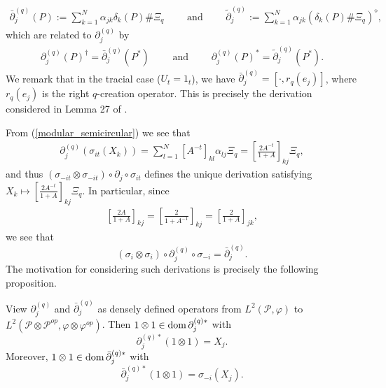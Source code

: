 	\begin{align*}
		\bar{\partial}_j^{(q)}(P):=\sum_{k=1}^N \alpha_{jk}\delta_k(P)\# \Xi_q\qquad\text{ and }\qquad \tilde{\partial}_j^{(q)} :=\sum_{k=1}^N \alpha_{jk} \left(\delta_k(P)\# \Xi_q\right)^\diamond,
	\end{align*}
which are related to $\partial_j^{(q)}$ by
	\begin{align*}
		\partial_j^{(q)}(P)^\dagger=\bar{\partial}_j^{(q)}(P^*)\qquad\text{ and }\qquad \partial_j^{(q)}(P)^* = \tilde{\partial}_j^{(q)}(P^*).
	\end{align*}
We remark that in the tracial case ($U_t=1_t$), we have $\bar{\partial}_{j}^{(q)}=[\cdot, r_q(e_j)]$, where $r_q(e_j)$ is the right $q$-creation operator. This is precisely the derivation considered in Lemma 27 of \cite{D}.\par
From (\ref{modular_semicircular}) we see that
	\begin{align*}
		\partial_j^{(q)}(\sigma_{it}(X_k))=\sum_{l=1}^N [A^{-t}]_{kl} \alpha_{lj} \Xi_q = \left[\frac{2A^{-t}}{1+A}\right]_{kj} \Xi_q,
	\end{align*}
and thus $(\sigma_{-it}\otimes\sigma_{-it})\circ\partial_j\circ\sigma_{it}$ defines the unique derivation satisfying $X_k\mapsto \left[\frac{2A^{-t}}{1+A}\right]_{kj}\Xi_q$. In particular, since
	\begin{align*}
		\left[\frac{2A}{1+A}\right]_{kj}=\left[\frac{2}{1+A^{-1}}\right]_{kj}=\left[\frac{2}{1+A}\right]_{jk},
	\end{align*}
we see that
	\begin{equation}\label{differentiating_sigma_with_q}
		(\sigma_i\otimes\sigma_i)\circ\partial_j^{(q)}\circ\sigma_{-i}=\bar{\partial}_j^{(q)}.
	\end{equation}
The motivation for considering such derivations is precisely the following proposition.

\begin{prop}\label{adjoint_of_q-derivations}
View $\partial_j^{(q)}$ and $\bar{\partial}_j^{(q)}$ as densely defined operators from $L^2(\mathscr{P},\varphi)$ to $L^2(\mathscr{P}\otimes \mathscr{P}^{op},\varphi\otimes\varphi^{op})$. Then $1\otimes 1\in \text{dom}\,\partial_j^{(q)*}$ with
	\begin{equation}\label{adjoint_of_1}
		\partial_j^{(q)*}(1\otimes 1)=X_j.
	\end{equation}
Moreover, $1\otimes1\in\text{dom}\,\bar{\partial}_j^{(q)*}$ with
	\begin{equation}
		\bar{\partial}_j^{(q)*}(1\otimes 1)=\sigma_{-i}(X_j).
	\end{equation}
\end{prop}

